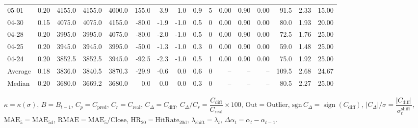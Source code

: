 \begin{threeparttable}
{\begin{tabular}{lrrrrrrrrrrrrrrr}
  05-01 &     0.20 & 4155.0 & 4155.0 & 4000.0 &      155.0 &            3.9 &                      1.0 &                 0.9 &              5 &       0.00 &      0.90 &           0.00 &             91.5 &            2.33 &                  15.00 \\
  04-30 &     0.15 & 4075.0 & 4075.0 & 4155.0 &      -80.0 &           -1.9 &                     -1.0 &                 0.5 &              0 &       0.00 &      0.90 &           0.00 &             80.0 &            1.93 &                  20.00 \\
  04-28 &     0.20 & 3995.0 & 3995.0 & 4075.0 &      -80.0 &           -2.0 &                     -1.0 &                 0.5 &              0 &       0.00 &      0.90 &           0.00 &             72.5 &            1.76 &                  25.00 \\
  04-25 &     0.20 & 3945.0 & 3945.0 & 3995.0 &      -50.0 &           -1.3 &                     -1.0 &                 0.3 &              0 &       0.00 &      0.90 &           0.00 &             59.0 &            1.48 &                  25.00 \\
  04-24 &     0.20 & 3852.5 & 3852.5 & 3945.0 &      -92.5 &           -2.3 &                     -1.0 &                 0.5 &              1 &       0.00 &      0.90 &           0.00 &             75.0 &            1.92 &                  25.00 \\
Average &     0.18 & 3836.0 & 3840.5 & 3870.3 &      -29.9 &           -0.6 &                      0.0 &                 0.6 &              0 &         -- &        -- &             -- &            109.5 &            2.68 &                  24.67 \\
 Median &     0.20 & 3680.0 & 3669.2 & 3680.0 &        0.0 &            0.0 &                      0.0 &                 0.3 &              0 &         -- &        -- &             -- &             80.5 &            2.27 &                  25.00 \\
\bottomrule
\end{tabular}
}
\begin{tablenotes}\footnotesize
\item $\kappa=\kappa(\sigma)$, $B=B_{t-1}$, $C_p=C_{\text{pred}}$, $C_r=C_{\text{real}}$, $C_\Delta=C_{\text{diff}}$, $C_\Delta/C_r=\dfrac{C_{\text{diff}}}{C_{\text{real}}}\times100$, $\mathrm{Out}=\text{Outlier}$, $\mathrm{sgn}\,C_\Delta=\operatorname{sign}(C_{\text{diff}})$, $|C_\Delta|/\sigma=\dfrac{|C_{\text{diff}}|}{\sigma_t^{\text{shift}}}$, $\mathrm{MAE}_5=\mathrm{MAE}_{5\text{d}}$, $\mathrm{RMAE}= \mathrm{MAE}_5 / \text{Close}$, $\mathrm{HR}_{20}=\mathrm{HitRate}_{20\text{d}}$, 
$\lambda_{\text{shift}}=\lambda_t$, 
$\Delta\alpha_t=\alpha_t-\alpha_{t-1}$.
\end{tablenotes}
\end{threeparttable}
\endgroup

